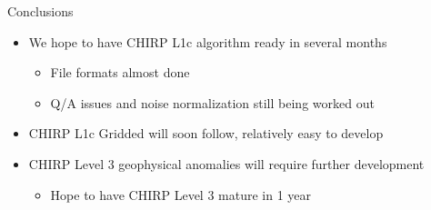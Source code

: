 \documentclass[10pt,t]{beamer}
\begin{document}
\begin{frame}[label={sec:org0b96a97}]{Conclusions}
\begin{itemize}
\item We hope to have CHIRP L1c algorithm ready in several months
\begin{itemize}
\item File formats almost done
\item Q/A issues and noise normalization still being worked out
\end{itemize}
\item CHIRP L1c Gridded will soon follow, relatively easy to develop
\item CHIRP Level 3 geophysical anomalies will require further development
\begin{itemize}
\item Hope to have CHIRP Level 3 mature in 1 year
\end{itemize}
\end{itemize}
\end{frame}
\end{document}
